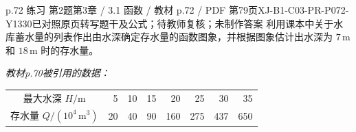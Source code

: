 \par\noindent\begin{minipage}{\linewidth}
\begin{bankitem}{p.72 练习 第2题}{第3章 / 3.1 函数 / 教材 p.72 / PDF 第79页}{XJ-B1-C03-PR-P072-Y1330}{已对照原页转写题干及公式；待教师复核；未制作答案}
利用课本中关于水库蓄水量的列表作出由水深确定存水量的函数图象，并根据图象估计出水深为 $7\,\mathrm m$ 和 $18\,\mathrm m$ 时的存水量。
\par\textit{教材p.70被引用的数据：}
\begin{center}\begin{tabular}{c|rrrrrrr}\hline
最大水深 $H/\mathrm m$&5&10&15&20&25&30&35\\
存水量 $Q/(10^4\,\mathrm{m^3})$&20&40&90&160&275&437&650\\\hline
\end{tabular}\end{center}
\end{bankitem}
\end{minipage}\par\medskip

